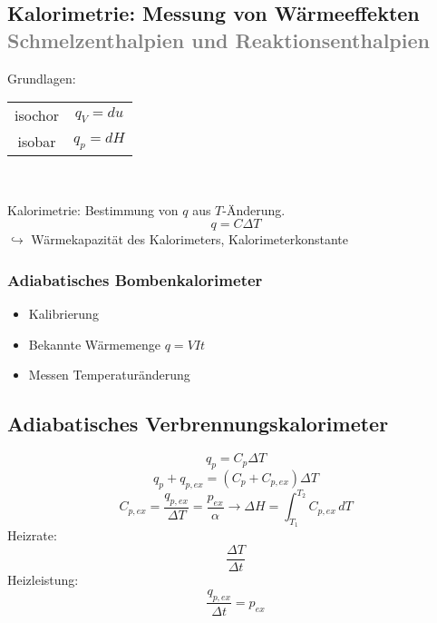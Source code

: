 \documentclass[a4paper]{article}
\begin{document}
\subsection{Kalorimetrie: Messung von Wärmeeffekten \textcolor{gray}{Schmelzenthalpien und Reaktionsenthalpien}}
Grundlagen:\\
\begin{center}
    \begin{tabular}{c c}
        \hline
        isochor & $q_V = du$\\
        isobar & $q_p = dH$\\
        \hline
    \end{tabular}\\
\end{center}
Kalorimetrie: Bestimmung von $q$ aus $T$-Änderung.\\
\begin{equation*}
    q = C\Delta T
\end{equation*}
$\hookrightarrow$ Wärmekapazität des Kalorimeters, Kalorimeterkonstante\\

\subsubsection{Adiabatisches Bombenkalorimeter}
\begin{itemize}
    \item Kalibrierung
    \item Bekannte Wärmemenge $q = VIt$
    \item Messen Temperaturänderung
\end{itemize}

\subsection{Adiabatisches Verbrennungskalorimeter}
\begin{equation*}
    q_p = C_p \Delta T
\end{equation*}
\begin{equation*}
    q_p + q_{p,ex} = (C_p + C_{p,ex}) \Delta T
\end{equation*}
\begin{equation*}
    C_{p,ex} = \frac{q_{p,ex}}{\Delta T} = \frac{p_{ex}}{\alpha} \rightarrow \Delta H = \int_{T_1}^{T_2} C_{p,ex} \, dT
\end{equation*}
Heizrate:
\begin{equation*}
    \frac{\Delta T}{\Delta t}
\end{equation*}
Heizleistung:
\begin{equation*}
    \frac{q_{p,ex}}{\Delta t} = p_{ex}
\end{equation*}
\end{document}
